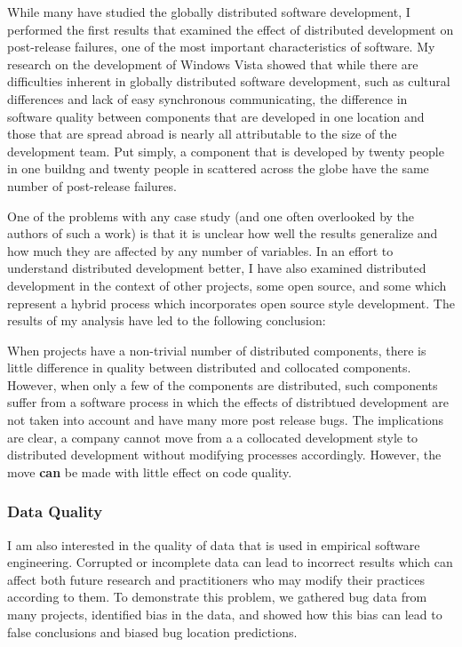 \documentclass[10pt]{article}
\newcommand\Subsection[1]{\subsubsection*{#1}}
\begin{document}
\begin{small}
While many have studied the globally distributed software development, I
performed the first results that examined the effect of distributed development
on post-release failures, one of the most important characteristics of
software.  My research on the development of Windows Vista showed that while
there are difficulties inherent in globally distributed software development,
such as cultural differences and lack of easy synchronous communicating, the
difference in software quality between components that are developed in one
location and those that are spread abroad is nearly all attributable to the
size of the development team.  Put simply, a component that is developed by twenty
people in one buildng and twenty people in scattered across the globe have the
same number of post-release failures.

One of the problems with any case study (and one often overlooked by the
authors of such a work) is that it is unclear how well the results generalize
and how much they are affected by any number of variables.  In an effort to
understand distributed development better, I have also examined distributed
development in the context of other projects, some open source, and some which
represent a hybrid process which incorporates open source style development.
The results of my analysis have led to the following conclusion:

When projects have a non-trivial number of distributed components, there is
little difference in quality between distributed and collocated components.
However, when only a few of the components are distributed, such components
suffer from a software process in which the effects of distribtued development
are not taken into account and have many more post release bugs.  The
implications are clear, a company cannot move from a a collocated development
style to distributed development without modifying processes accordingly.
However, the move \textbf{can} be made with little effect on code quality.


\Subsection{Data Quality}

I am also interested in the quality of data that is used in empirical software
engineering.  Corrupted or incomplete data can lead to incorrect results which
can affect both future research and practitioners who may modify their
practices according to them.  To demonstrate this problem, we gathered bug data
from many projects, identified bias in the data, and showed how this bias can
lead to false conclusions and biased bug location predictions.


\end{small}
\end{document}

